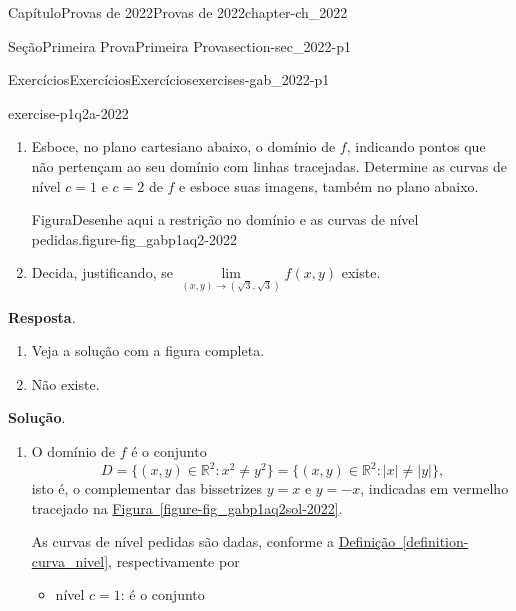 \documentclass[oneside,10pt,]{book}
\newcommand{\blocktitlefont}{\relax}
\newcommand{\xreffont}{\relax}
\numberwithin{equation}{section}
\newcommand{\R}{\mathbb R}
\begin{document}
\begin{chapterptx}{Capítulo}{Provas de 2022}{}{Provas de 2022}{}{}{chapter-ch_2022}
\begin{sectionptx}{Seção}{Primeira Prova}{}{Primeira Prova}{}{}{section-sec_2022-p1}
\begin{exercises-subsection-numberless}{Exercícios}{Exercícios}{}{Exercícios}{}{}{exercises-gab_2022-p1}
\begin{divisionexercise}{2}{}{}{exercise-p1q2a-2022}
\begin{enumerate}[label=\alph*]
\item{}Esboce, no plano cartesiano abaixo, o domínio de \(f\), indicando pontos que não pertençam ao seu domínio com linhas tracejadas. Determine as curvas de nível \(c=1\) e \(c=2\) de \(f\) e esboce suas imagens, também no plano abaixo. \begin{figureptx}{Figura}{Desenhe aqui a restrição no domínio e as curvas de nível pedidas.}{figure-fig_gabp1aq2-2022}{}%
\begin{image}{0.25}{0.5}{0.25}{}%
%
\end{image}%
\tcblower
\end{figureptx}%
%
\item{}Decida, justificando, se \(\lim\limits_{(x,y)\to(\sqrt{3},\sqrt{3})}f(x,y)\) existe.%
\end{enumerate}
\par\smallskip%
\noindent\textbf{\blocktitlefont Resposta}.\hypertarget{answer-p1q2a-2022-b}{}\quad{}%
\begin{enumerate}[label=\alph*]
\item{}Veja a solução com a figura completa.%
\item{}Não existe.%
\end{enumerate}
\par\smallskip%
\noindent\textbf{\blocktitlefont Solução}.\hypertarget{solution-p1q2a-2022-c}{}\quad{}%
\begin{enumerate}[label=\alph*]
\item{}O domínio de \(f\) é o conjunto%
\begin{equation*}
D=\big\{(x,y)\in\R^2\colon x^2\neq 
y^2\big\}=\big\{(x,y)\in\R^2\colon |x|\neq |y|\big\}\text{,}
\end{equation*}
isto é, o complementar das bissetrizes \(y=x\) e \(y=-x\), indicadas em vermelho tracejado na \hyperref[figure-fig_gabp1aq2sol-2022]{Figura~{\xreffont\ref{figure-fig_gabp1aq2sol-2022}}}.%
\par
As curvas de nível pedidas são dadas, conforme a \hyperref[definition-curva_nivel]{Definição~{\xreffont\ref{definition-curva_nivel}}}, respectivamente por%
\begin{itemize}[label=\textbullet]
\item{}nível \(c=1\): é o conjunto%

\end{itemize}
\end{enumerate}
\end{divisionexercise}
\end{exercises-subsection-numberless}
\end{sectionptx}
\end{chapterptx}
\end{document}
